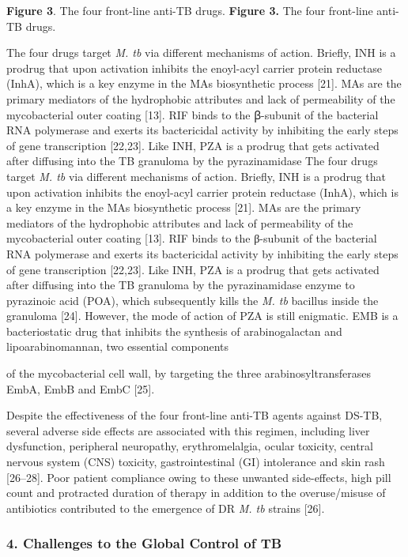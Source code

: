 \documentclass{article}
\begin{document}
\textbf{Figure 3}. The four front-line anti-TB drugs. \textbf{Figure 3.} The four front-line anti-TB drugs.

The four drugs target \textit{M. tb} via different mechanisms of action. Briefly, INH is a prodrug that upon activation inhibits the enoyl-acyl carrier protein reductase (InhA), which is a key enzyme in the MAs biosynthetic process [21]. MAs are the primary mediators of the hydrophobic attributes and lack of permeability of the mycobacterial outer coating [13]. RIF binds to the ꞵ-subunit of the bacterial RNA polymerase and exerts its bactericidal activity by inhibiting the early steps of gene transcription [22,23]. Like INH, PZA is a prodrug that gets activated after diffusing into the TB granuloma by the pyrazinamidase The four drugs target \textit{M. tb} via different mechanisms of action. Briefly, INH is a prodrug that upon activation inhibits the enoyl-acyl carrier protein reductase (InhA), which is a key enzyme in the MAs biosynthetic process [21]. MAs are the primary mediators of the hydrophobic attributes and lack of permeability of the mycobacterial outer coating [13]. RIF binds to the β-subunit of the bacterial RNA polymerase and exerts its bactericidal activity by inhibiting the early steps of gene transcription [22,23]. Like INH, PZA is a prodrug that gets activated after diffusing into the TB granuloma by the pyrazinamidase enzyme to pyrazinoic acid (POA), which subsequently kills the \textit{M. tb} bacillus inside the granuloma [24]. However, the mode of action of PZA is still enigmatic. EMB is a bacteriostatic drug that inhibits the synthesis of arabinogalactan and lipoarabinomannan, two essential components

of the mycobacterial cell wall, by targeting the three arabinosyltransferases EmbA, EmbB and EmbC [25].

Despite the effectiveness of the four front-line anti-TB agents against DS-TB, several adverse side effects are associated with this regimen, including liver dysfunction, peripheral neuropathy, erythromelalgia, ocular toxicity, central nervous system (CNS) toxicity, gastrointestinal (GI) intolerance and skin rash [26–28]. Poor patient compliance owing to these unwanted side-effects, high pill count and protracted duration of therapy in addition to the overuse/misuse of antibiotics contributed to the emergence of DR \textit{M. tb} strains [26].

\subsubsection{\textbf{4. Challenges to the Global Control of TB}}
\end{document}
